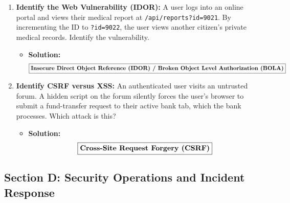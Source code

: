 \begin{enumerate}[label=\textbf{Problem \arabic*.,resume},leftmargin=1.5cm]
\item \textbf{Identify the Web Vulnerability (IDOR):}
A user logs into an online portal and views their medical report at \texttt{/api/reports?id=9021}. By incrementing the ID to \texttt{?id=9022}, the user views another citizen's private medical records. Identify the vulnerability.
\begin{itemize}
\item \textbf{Solution:}
\[ \boxed{\text{\textbf{Insecure Direct Object Reference (IDOR) / Broken Object Level Authorization (BOLA)}}} \]
\end{itemize}

\item \textbf{Identify CSRF versus XSS:}
An authenticated user visits an untrusted forum. A hidden script on the forum silently forces the user's browser to submit a fund-transfer request to their active bank tab, which the bank processes. Which attack is this?
\begin{itemize}
\item \textbf{Solution:}
\[ \boxed{\text{\textbf{Cross-Site Request Forgery (CSRF)}}} \]
\end{itemize}
\end{enumerate}

\subsection{Section D: Security Operations and Incident Response}

